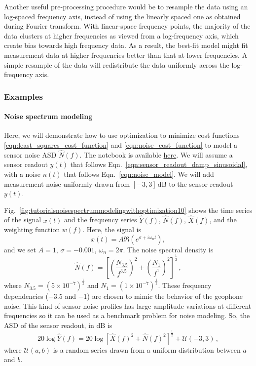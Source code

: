 Another useful pre-processing procedure would be to resample the data using an log-spaced frequency axis, instead of using the linearly spaced one as obtained during Fourier transform.
With linear-space frequency points, the majority of the data clusters at higher frequencies as viewed from a log-frequency axis, which create bias towards high frequency data.
As a result, the best-fit model might fit measurement data at higher frequencies better than that at lower frequencies.
A simple resample of the data will redistribute the data uniformly across the log-frequency axis.

\subsubsection{Examples \label{sec:curve_fitting_examples}}
\paragraph{Noise spectrum modeling}
Here, we will demonstrate how to use optimization to minimize cost functions \eqref{eqn:least_squares_cost_function} and \eqref{eqn:noise_cost_function} to model a sensor noise ASD $\hat{N}(f)$.
The notebook is available \href{https://kontrol.readthedocs.io/en/latest/tutorials/noise_spectrum_modeling_with_optimization.html}{here}.
We will assume a sensor readout $y(t)$ that follows Eqn.~\eqref{eqn:sensor_readout_damp_sinusoidal}, with a noise $n(t)$ that follows Eqn.~\eqref{eqn:noise_model}.
We will add measurement noise uniformly drawn from $[-3, 3]\,\mathrm{dB}$ to the sensor readout $y(t)$.

Fig.~\ref{fig:tutorialsnoisespectrummodelingwithoptimization10} shows the time series of the signal $x(t)$ and the frequency series $\hat{Y}(f)$, $\hat{N}(f)$, $\hat{X}(f)$, and the weighting function $w(f)$.
Here, the signal is
\begin{equation}
	x(t) = A\Re{\left(e^{\sigma+i\omega_n t}\right)},
\end{equation}
and we set $A=1$, $\sigma=-0.001$, $\omega_n=2\pi$.
The noise spectral density is
\begin{equation}
	\hat{N}(f) = \left[\left(\frac{N_{3.5}}{f^{3.5}}\right)^2+\left(\frac{N_1}{f^1}\right)^2\right]^\frac{1}{2}\,,
\end{equation}
where $N_{3.5}=\left(5\times10^{-7}\right)^\frac{1}{2}$ and $N_1=\left(1\times10^{-7}\right)^\frac{1}{2}$.
These frequency dependencies ($-3.5$ and $-1$) are chosen to mimic the behavior of the geophone noise.
This kind of sensor noise profiles has large amplitude variations at different frequencies so it can be used as a benchmark problem for noise modeling.
So, the ASD of the sensor readout, in $\mathrm{dB}$ is
\begin{equation}
	20\log\hat{Y}(f) = 20\log\left[\hat{X}(f)^2 + \hat{N}(f)^2\right]^\frac{1}{2} + \mathcal{U}(-3, 3)\,,
\end{equation}
where $\mathcal{U}(a,b)$ is a random series drawn from a uniform distribution between $a$ and $b$.

